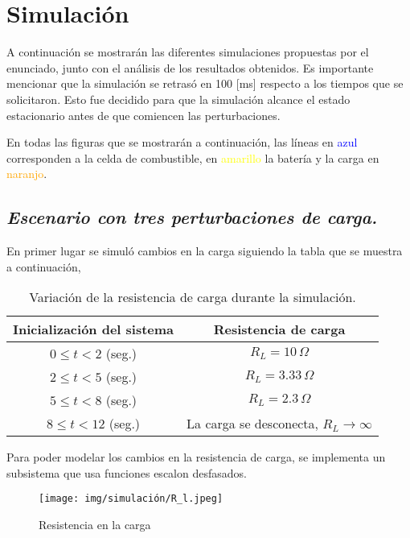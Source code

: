 \section{Simulación}
A continuación se mostrarán las diferentes simulaciones propuestas por el enunciado, junto con el análisis de los resultados obtenidos.
Es importante mencionar que la simulación se retrasó en 100 [ms] respecto a los tiempos que se solicitaron.
Esto fue decidido para que la simulación alcance el estado estacionario antes de que comiencen las perturbaciones.

En todas las figuras que se mostrarán a continuación, las líneas en \textcolor{blue}{azul}
corresponden a la celda de combustible, en \textcolor{yellow}{amarillo} la
batería y la carga en \textcolor{orange}{naranjo}.

\subsection{\textit{Escenario con tres perturbaciones de carga.}}

En primer lugar se simuló cambios en la carga siguiendo la tabla que se 
muestra a continuación, 

\begin{table}[H]
\centering
\begin{tabular}{|c|c|}
\hline
\textbf{Inicialización del sistema} & \textbf{Resistencia de carga} \\
\hline
$0 \leq t < 2$ (seg.) & $R_L = 10\,\Omega$ \\
\hline
$2 \leq t < 5$ (seg.) & $R_L = 3.33\,\Omega$ \\
\hline
$5 \leq t < 8$ (seg.) & $R_L = 2.3\,\Omega$ \\
\hline
$8 \leq t < 12$ (seg.) & La carga se desconecta, $R_L \rightarrow \infty$ \\
\hline
\end{tabular}
\caption{Variación de la resistencia de carga durante la simulación.}
\label{tab:e}
\end{table}

Para poder modelar los cambios en la resistencia de carga, se implementa un subsistema que
usa funciones escalon desfasados.

\begin{figure}[H]
    \centering
    \texttt{[image: img/simulación/R\_l.jpeg]}
    \caption{Resistencia en la carga}
    \label{fig:R_l}
\end{figure}

